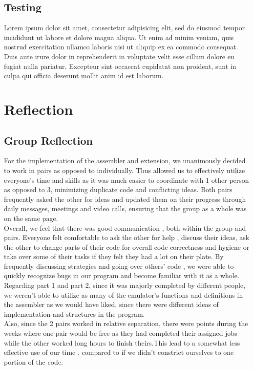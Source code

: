 \documentclass[11pt, letterpaper]{article}
\begin{document}
\subsection{Testing}
Lorem ipsum dolor sit amet, consectetur adipisicing elit, sed do eiusmod tempor
incididunt ut labore et dolore magna aliqua. Ut enim ad minim veniam, quis
nostrud exercitation ullamco laboris nisi ut aliquip ex ea commodo consequat.
Duis aute irure dolor in reprehenderit in voluptate velit esse cillum dolore eu
fugiat nulla pariatur. Excepteur sint occaecat cupidatat non proident, sunt in
culpa qui officia deserunt mollit anim id est laborum.

\section{Reflection}
\subsection{Group Reflection}
For the implementation of the assembler and extension, we unanimously decided to work in pairs as opposed to individually. Thus allowed us to effectively utilize everyone's time and skills as it was much easier to coordinate with 1 other person as opposed to 3, minimizing duplicate code and conflicting ideas. Both pairs frequently asked the other for ideas and updated them on their progress through daily messages, meetings and video calls, ensuring that the group as a whole was on the same page.
\\ \newline
Overall, we feel that there was good communication , both within the group and pairs. Everyone felt comfortable to ask the other for help , discuss their ideas, ask the other to change parts of their code for overall code correctness and hygiene or take over some of their tasks if they felt they had a lot on their plate. By frequently discussing strategies and going over others' code , we were able to quickly recognize bugs in our program and become familiar with it as a whole.
\\ \newline
Regarding part 1 and part 2, since it was majorly completed by different people, we weren't able to utilize as many of the emulator's functions and definitions in the assembler as we would have liked, since there were different ideas of implementation and structures in the program.
\\ \newline
Also, since the 2 pairs worked in relative separation, there were points during the weeks where one pair would be free as they had completed their assigned jobs while the other worked long hours to finish theirs.This lead to a somewhat less effective use of our time , compared to if we didn't constrict ourselves to one portion of the code.
\end{document}
